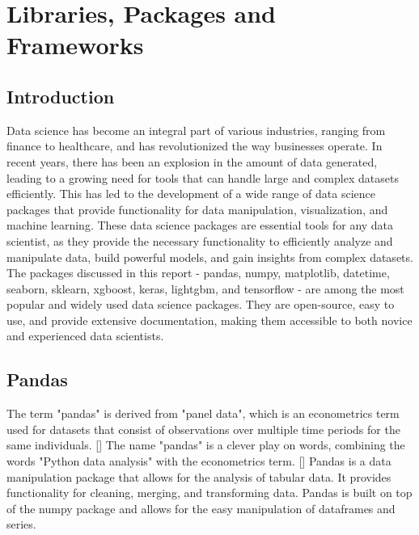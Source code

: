 %
%

\chapter{Libraries, Packages and Frameworks}

\section{Introduction}

Data science has become an integral part of various industries, ranging from finance to healthcare, and has revolutionized the way businesses operate. In recent years, there has been an explosion in the amount of data generated, leading to a growing need for tools that can handle large and complex datasets efficiently. This has led to the development of a wide range of data science packages that provide functionality for data manipulation, visualization, and machine learning.
These data science packages are essential tools for any data scientist, as they provide the necessary functionality to efficiently analyze and manipulate data, build powerful models, and gain insights from complex datasets. The packages discussed in this report - pandas, numpy, matplotlib, datetime, seaborn, sklearn, xgboost, keras, lightgbm, and tensorflow - are among the most popular and widely used data science packages. They are open-source, easy to use, and provide extensive documentation, making them accessible to both novice and experienced data scientists.

\section{Pandas}

The term "pandas" is derived from "panel data", which is an econometrics term used for datasets that consist of observations over multiple time periods for the same individuals. [\cite{Mckinney:2011}] The name "pandas" is a clever play on words, combining the words "Python data analysis" with the econometrics term. [\cite{Mckinney:2022}] Pandas is a data manipulation package that allows for the analysis of tabular data. It provides functionality for cleaning, merging, and transforming data. Pandas is built on top of the numpy package and allows for the easy manipulation of dataframes and series.


